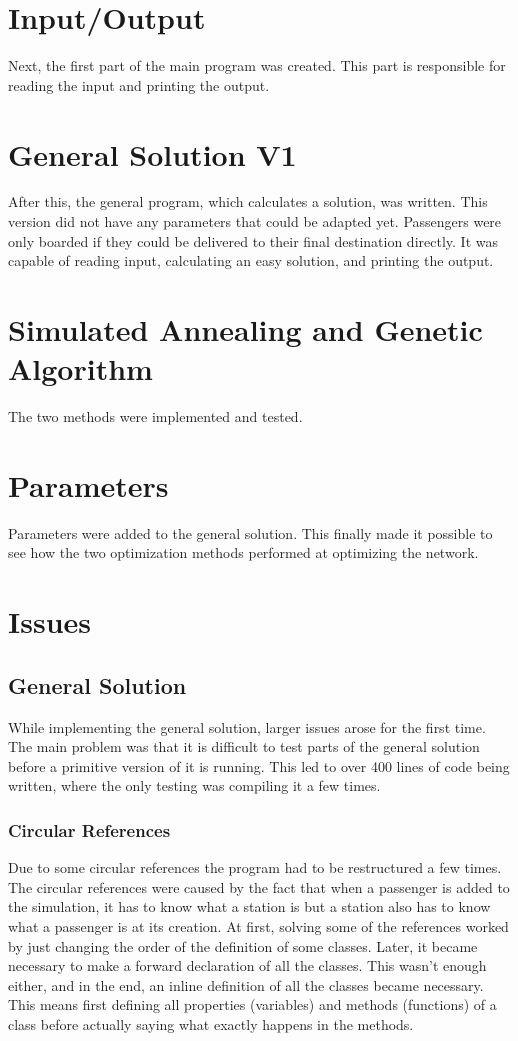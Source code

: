 \documentclass[10pt]{scrreprt}
\begin{document}
\section{Input/Output}
Next, the first part of the main program was created. This part is responsible for reading the input and printing the output.

\section{General Solution V1}
After this, the general program, which calculates a solution, was written. This version did not have any parameters that could be adapted yet. Passengers were only boarded if they could be delivered to their final destination directly. It was capable of reading input, calculating an easy solution, and printing the output.

\section{Simulated Annealing and Genetic Algorithm}
The two methods were implemented and tested.

\section{Parameters}
Parameters were added to the general solution. This finally made it possible to see how the two optimization methods performed at optimizing the network.

\section{Issues}
\subsection{General Solution}
While implementing the general solution, larger issues arose for the first time. The main problem was that it is difficult to test parts of the general solution before a primitive version of it is running. This led to over 400 lines of code being written, where the only testing was compiling it a few times.

\subsubsection{Circular References}
Due to some circular references the program had to be restructured a few times. The circular references were caused by the fact that when a passenger is added to the simulation, it has to know what a station is but a station also has to know what a passenger is at its creation. At first, solving some of the references worked by just changing the order of the definition of some classes. Later, it became necessary to make a forward declaration of all the classes. This wasn't enough either, and in the end, an inline definition of all the classes became necessary. This means first defining all properties (variables) and methods (functions) of a class before actually saying what exactly happens in the methods.
\end{document}
